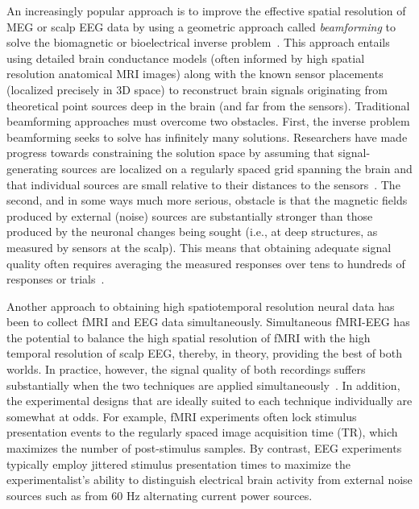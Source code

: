 \documentclass[11pt]{article}
\begin{document}
An increasingly popular approach is to improve the effective spatial
resolution of MEG or scalp EEG data by using a geometric approach
called \textit{beamforming} to solve the biomagnetic or bioelectrical
inverse problem~\citep{Sarv87}.  This approach entails using detailed
brain conductance models (often informed by high spatial resolution
anatomical MRI images) along with the known sensor placements
(localized precisely in 3D space) to reconstruct brain signals
originating from theoretical point sources deep in the brain (and far
from the sensors).  Traditional beamforming approaches must overcome
two obstacles.  First, the inverse problem beamforming seeks to solve
has infinitely many solutions.  Researchers have made progress towards
constraining the solution space by assuming that signal-generating
sources are localized on a regularly spaced grid spanning the brain
and that individual sources are small relative to their distances to
the sensors~\citep{Snyd91, BailEtal01, HillEtal05}.  The second, and in
some ways much more serious, obstacle is that the magnetic fields
produced by external (noise) sources are substantially stronger than
those produced by the neuronal changes being sought (i.e., at deep
structures, as measured by sensors at the scalp).  This means that
obtaining adequate signal quality often requires averaging the
measured responses over tens to hundreds of responses or trials~\citep[e.g., see review by][]{HillEtal05}.

Another approach to obtaining high spatiotemporal resolution neural data has
been to collect fMRI and EEG data simultaneously. Simultaneous fMRI-EEG has the
potential to balance the high spatial resolution of fMRI with the high temporal
resolution of scalp EEG, thereby, in theory, providing the best of both worlds.
In practice, however, the signal quality of both recordings suffers
substantially when the two techniques are applied simultaneously~\citep[e.g.,
see review by][]{HustEtal12}. In addition, the experimental designs that are
ideally suited to each technique individually are somewhat at odds. For example,
fMRI experiments often lock stimulus presentation events to the regularly spaced
image acquisition time (TR), which maximizes the number of post-stimulus
samples.  By contrast, EEG experiments typically employ jittered stimulus
presentation times to maximize the experimentalist's ability to distinguish
electrical brain activity from external noise sources such as from 60 Hz
alternating current power sources.
\end{document}
